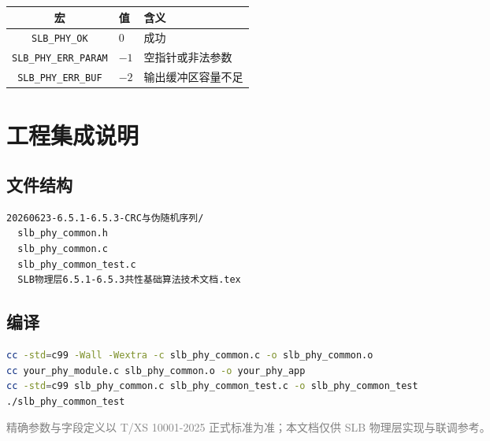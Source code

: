 \documentclass[11pt,a4paper]{ctexart}
\begin{document}
\begin{table}[h]
\centering
\begin{tabular}{cll}
\toprule
\textbf{宏} & \textbf{值} & \textbf{含义} \\
\midrule
\texttt{SLB\_PHY\_OK} & 0 & 成功 \\
\texttt{SLB\_PHY\_ERR\_PARAM} & $-1$ & 空指针或非法参数 \\
\texttt{SLB\_PHY\_ERR\_BUF} & $-2$ & 输出缓冲区容量不足 \\
\bottomrule
\end{tabular}
\end{table}

\section{工程集成说明}

\subsection{文件结构}

\begin{lstlisting}
20260623-6.5.1-6.5.3-CRC与伪随机序列/
  slb_phy_common.h
  slb_phy_common.c
  slb_phy_common_test.c
  SLB物理层6.5.1-6.5.3共性基础算法技术文档.tex
\end{lstlisting}

\subsection{编译}

\begin{lstlisting}[language=bash]
cc -std=c99 -Wall -Wextra -c slb_phy_common.c -o slb_phy_common.o
cc your_phy_module.c slb_phy_common.o -o your_phy_app
cc -std=c99 slb_phy_common.c slb_phy_common_test.c -o slb_phy_common_test
./slb_phy_common_test
\end{lstlisting}

\vfill
\begin{center}
\small\textcolor{gray}{精确参数与字段定义以 T/XS 10001-2025 正式标准为准；本文档仅供 SLB 物理层实现与联调参考。}
\end{center}
\end{document}
